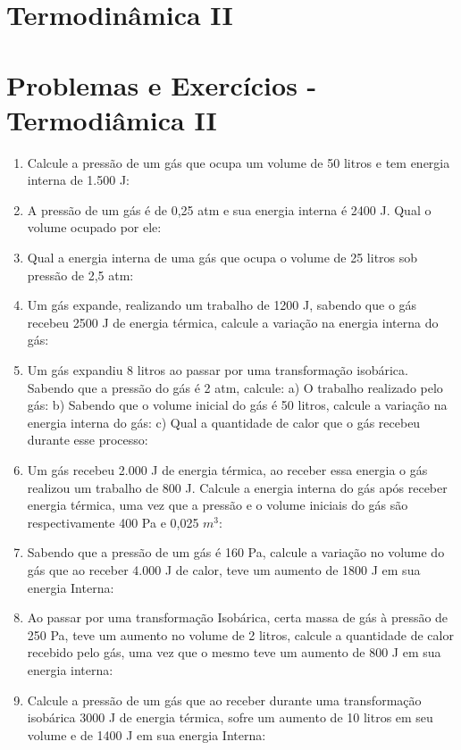 \documentclass[12pt,a4paper]{book}
\begin{document}
	\newpage \section{Termodinâmica II}
	\newpage \section{Problemas e Exercícios - Termodiâmica II}
	
\begin{enumerate}
\item Calcule a pressão de um gás que ocupa um volume de 50 litros e tem energia interna de 1.500 J:
\item A pressão de um gás é de 0,25 atm e sua energia interna é 2400 J. Qual o volume ocupado por ele:
\item Qual a energia interna de uma gás que ocupa o volume de 25 litros sob pressão de 2,5 atm:
\item Um gás expande, realizando um trabalho de 1200 J, sabendo que o gás recebeu 2500 J de energia térmica, calcule a variação na energia interna do gás:
\item Um gás expandiu 8 litros ao passar por uma transformação isobárica. Sabendo que a pressão do gás é 2 atm, calcule:
\newline a)	O trabalho realizado pelo gás:
\newline b)	Sabendo que o volume inicial do gás é 50 litros, calcule a variação na energia interna do gás:
\newline c)	Qual a quantidade de calor que o gás recebeu durante esse processo:
\item Um gás recebeu 2.000 J de energia térmica, ao receber essa energia o gás realizou um trabalho de 800 J. Calcule a energia interna do gás após receber energia térmica, uma vez que a pressão e o volume iniciais do gás são respectivamente 400 Pa e 0,025 $m^3$: 
\item Sabendo que a pressão de um gás é 160 Pa, calcule a variação no volume do gás que ao receber 4.000 J de calor, teve um aumento de 1800 J em sua energia Interna:
\item Ao passar por uma transformação Isobárica, certa massa de gás à pressão de 250 Pa, teve um aumento no volume de 2 litros, calcule a quantidade de calor recebido pelo gás, uma vez que o mesmo teve um aumento de 800 J em sua energia interna:
\item Calcule a pressão de um gás que ao receber durante uma transformação isobárica 3000 J de energia térmica, sofre um aumento de 10 litros em seu volume e de 1400 J em sua energia Interna: 
\end{enumerate}	 
\end{document}
